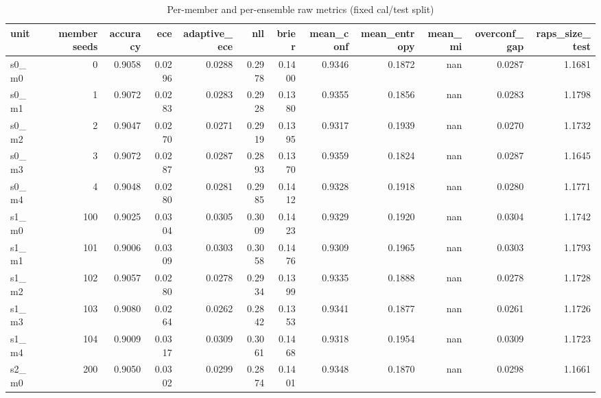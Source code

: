 \begin{table}
\centering
\caption{Per-member and per-ensemble raw metrics (fixed cal/test split)}
\label{tab:de_per_seed_raw}
\begin{tabular}{lrrrrrrrrrrr}
\toprule
           unit &        member seeds & accuracy &    ece & adaptive\_ece &    nll &  brier & mean\_conf & mean\_entropy & mean\_mi & overconf\_gap & raps\_size\_test \\
\midrule
          s0\_m0 &                   0 &   0.9058 & 0.0296 &       0.0288 & 0.2978 & 0.1400 &    0.9346 &       0.1872 &     nan &       0.0287 &         1.1681 \\
          s0\_m1 &                   1 &   0.9072 & 0.0283 &       0.0283 & 0.2928 & 0.1380 &    0.9355 &       0.1856 &     nan &       0.0283 &         1.1798 \\
          s0\_m2 &                   2 &   0.9047 & 0.0270 &       0.0271 & 0.2919 & 0.1395 &    0.9317 &       0.1939 &     nan &       0.0270 &         1.1732 \\
          s0\_m3 &                   3 &   0.9072 & 0.0287 &       0.0287 & 0.2893 & 0.1370 &    0.9359 &       0.1824 &     nan &       0.0287 &         1.1645 \\
          s0\_m4 &                   4 &   0.9048 & 0.0280 &       0.0281 & 0.2985 & 0.1412 &    0.9328 &       0.1918 &     nan &       0.0280 &         1.1771 \\
          s1\_m0 &                 100 &   0.9025 & 0.0304 &       0.0305 & 0.3009 & 0.1423 &    0.9329 &       0.1920 &     nan &       0.0304 &         1.1742 \\
          s1\_m1 &                 101 &   0.9006 & 0.0309 &       0.0303 & 0.3058 & 0.1476 &    0.9309 &       0.1965 &     nan &       0.0303 &         1.1793 \\
          s1\_m2 &                 102 &   0.9057 & 0.0280 &       0.0278 & 0.2934 & 0.1399 &    0.9335 &       0.1888 &     nan &       0.0278 &         1.1728 \\
          s1\_m3 &                 103 &   0.9080 & 0.0264 &       0.0262 & 0.2842 & 0.1353 &    0.9341 &       0.1877 &     nan &       0.0261 &         1.1726 \\
          s1\_m4 &                 104 &   0.9009 & 0.0317 &       0.0309 & 0.3061 & 0.1468 &    0.9318 &       0.1954 &     nan &       0.0309 &         1.1723 \\
          s2\_m0 &                 200 &   0.9050 & 0.0302 &       0.0299 & 0.2874 & 0.1401 &    0.9348 &       0.1870 &     nan &       0.0298 &         1.1661 \\

\end{tabular}
\end{table}
